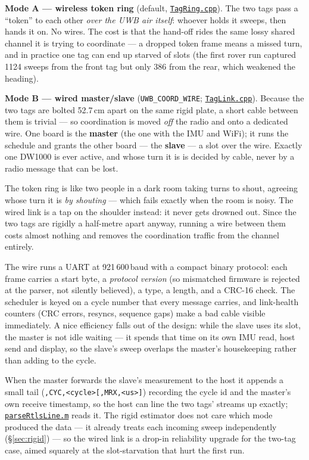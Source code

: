 \documentclass[11pt,a4paper]{article}
\newcommand{\gh}[2]{\href{https://github.com/AdershM-2/UWB_3/blob/main/#1}{\texttt{#2}}}
\newcommand{\code}[1]{\texttt{#1}}
\begin{document}
\textbf{Mode A --- wireless token ring} (default,
\gh{libraries/UwbRtls/src/TagRing.cpp}{TagRing.cpp}). The two tags pass a ``token''
to each other \emph{over the UWB air itself}: whoever holds it sweeps, then hands it
on. No wires. The cost is that the hand-off rides the same lossy shared channel it
is trying to coordinate --- a dropped token frame means a missed turn, and in
practice one tag can end up starved of slots (the first rover run captured 1124
sweeps from the front tag but only 386 from the rear, which weakened the heading).

\textbf{Mode B --- wired master/slave} (\code{UWB\_COORD\_WIRE};
\gh{libraries/UwbRtls/src/TagLink.cpp}{TagLink.cpp}). Because the two tags are
bolted 52.7\,cm apart on the same rigid plate, a short cable between them is trivial
--- so coordination is moved \emph{off} the radio and onto a dedicated wire. One
board is the \textbf{master} (the one with the IMU and WiFi); it runs the schedule
and grants the other board --- the \textbf{slave} --- a slot over the wire. Exactly
one DW1000 is ever active, and whose turn it is is decided by cable, never by a radio
message that can be lost.

\begin{plainwords}
The token ring is like two people in a dark room taking turns to shout, agreeing
whose turn it is \emph{by shouting} --- which fails exactly when the room is noisy.
The wired link is a tap on the shoulder instead: it never gets drowned out. Since the
two tags are rigidly a half-metre apart anyway, running a wire between them costs
almost nothing and removes the coordination traffic from the channel entirely.
\end{plainwords}

The wire runs a UART at 921\,600\,baud with a compact binary protocol: each frame
carries a start byte, a \emph{protocol version} (so mismatched firmware is rejected
at the parser, not silently believed), a type, a length, and a CRC-16 check. The
scheduler is keyed on a cycle number that every message carries, and link-health
counters (CRC errors, resyncs, sequence gaps) make a bad cable visible immediately.
A nice efficiency falls out of the design: while the slave uses its slot, the master
is not idle waiting --- it spends that time on its own IMU read, host send and
display, so the slave's sweep overlaps the master's housekeeping rather than adding
to the cycle.

When the master forwards the slave's measurement to the host it appends a small tail
(\code{,CYC,<cycle>[,MRX,<us>]}) recording the cycle id and the master's own receive
timestamp, so the host can line the two tags' streams up exactly;
\gh{matlab/+dune/parseRtlsLine.m}{parseRtlsLine.m} reads it. The rigid estimator
does not care which mode produced the data --- it already treats each incoming sweep
independently (\S\ref{sec:rigid}) --- so the wired link is a drop-in reliability
upgrade for the two-tag case, aimed squarely at the slot-starvation that hurt the
first run.
\end{document}
